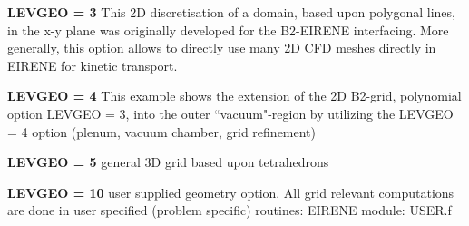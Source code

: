 {\bf LEVGEO = 3} This 2D discretisation of a domain, based upon polygonal lines,  in the x-y
plane was originally developed for the B2-EIRENE interfacing. More generally, this option allows to
directly use many 2D CFD meshes directly in EIRENE for kinetic transport.

{\bf LEVGEO = 4} This example shows the extension of the 2D
B2-grid, polynomial option LEVGEO = 3, into the outer
``vacuum"-region by utilizing the LEVGEO = 4 option (plenum, vacuum
chamber, grid refinement)

{\bf LEVGEO = 5} general 3D grid based upon tetrahedrons

{\bf LEVGEO = 10} user supplied geometry option. All grid relevant computations are
done in user specified (problem specific) routines: EIRENE module:  USER.f

